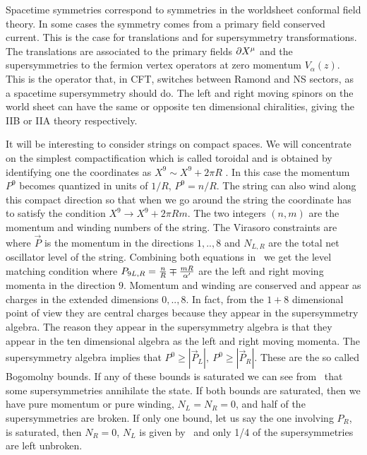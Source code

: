 Spacetime symmetries correspond to symmetries in the worldsheet 
conformal field theory. In some cases the symmetry comes
from a primary field conserved current.
This is the case for translations and for supersymmetry transformations.
The translations are associated to the primary fields $\partial X^\mu $ and
the supersymmetries to the fermion vertex operators at zero momentum
$V_\alpha (z)$.
 This is the operator that,
in CFT,  switches between Ramond and NS sectors, as a spacetime
supersymmetry should do.
The left and right moving spinors on the world sheet can
have the same or opposite ten dimensional chiralities,
giving the IIB or  IIA theory respectively. 


It will be interesting to consider strings on compact spaces.
We will concentrate on the simplest compactification which is
called toroidal and is obtained by identifying  one the 
coordinates as $ X^9 \sim X^9 + 2 \pi R $ \GSW . 
In this case the momentum $P^9$ becomes quantized in units
of $1/R$, $P^9 = n/R $. The string can also wind 
along this compact direction so that when we go around
the string  the coordinate has to satisfy the
condition $X^9 \rightarrow X^9 + 2 \pi R m$.
The two integers $(n,m)$ are the momentum and winding numbers of the
string. The Virasoro constraints are
\eqn{}
where $\vec P$ is the momentum in the directions $1,..,8$ and
$N_{L,R}$ are the total net oscillator level of the 
string.
Combining both equations in \virasoro\
we get the level matching condition
\eqn{}
where $P_{9 L,R}= { n \over R } \mp { m R \over \alpha' }$ 
are the left and right moving momenta in the
direction $9$.
Momentum and winding are conserved and 
 appear as charges in the extended dimensions
$0,..,8$. In fact, from the $1+8$ dimensional point of view 
 they are  central charges because
they appear in the supersymmetry algebra.
The reason they appear in the supersymmetry algebra is that
they appear in the ten dimensional algebra as the left and
right moving momenta.
\eqn\susyten{
\{ Q_\alpha^L, Q_\beta^L \} = \Gamma_{\alpha \beta}^\mu 
P_{\mu L}~,~~~~~~~~~~~
\{ Q_\alpha^R, Q_\beta^R \} = \Gamma_{\alpha \beta}^\mu P_{\mu R}~.
}
The supersymmetry algebra implies that $P^0 \ge |\vec P_L |,~
P^0 \ge  
| \vec P_R | $. These are  the so called Bogomolny bounds.
If any of these   bounds is saturated we can see from \susyten\ that
some supersymmetries annihilate the state. 
If both bounds are saturated, then 
we have pure momentum or pure winding, 
$N_L = N_R =0$, and  half of the supersymmetries are broken.
If only one bound, let us  say the one involving $P_R$, is saturated, 
then $N_R =0$, $N_L$ is given by \matching\  and 
only 1/4 of the supersymmetries are left unbroken. 

